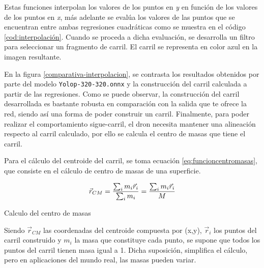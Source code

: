 Estas funciones interpolan los valores de los puntos en \textit{y} en función de los valores de los puntos en \textit{x}, 
más adelante se evalúa los valores de las puntos que se encuentran entre 
ambas regresiones cuadráticas como se muestra en el código \ref{cod:interpolación}. Cuando se proceda a dicha evaluación, se desarrolla un filtro 
para seleccionar un fragmento de carril. El carril se representa en color azul en la imagen resultante.\newline

En la figura \ref{comparativa-interpolacion}, se contrasta los resultados obtenidos por parte del modelo \texttt{Yolop-320-320.onnx} y la construcción del carril calculada a partir de las regresiones. 
Como se puede observar, la construcción del carril desarrollada es bastante robusta en comparación con la salida que te ofrece la red, siendo así una forma de poder construir un 
carril. Finalmente, para poder realizar el comportamiento sigue-carril, el dron necesita mantener una alineación respecto al carril calculado, por ello 
se calcula el centro de masas que tiene el carril. \newline

Para el cálculo del centroide del carril, se toma ecuación \ref{eq:funcioncentromasas}, que consiste en el cálculo de centro de masas de una superficie. \newline
  \begin{myequation}[h]
    \begin{equation} 
      \vec{r}_{CM} = \frac{\sum_{i}m_{i} \vec{r}_{i}}{\sum_{i}m_{i}} = \frac{\sum_{i}m_{i} \vec{r}_{i}}{M} 
      \newline
      \label{eq:funcioncentromasas}
    \end{equation} 
    \caption{Calculo del centro de masas}
  \end{myequation}

  Siendo $\vec{r}_{CM}$ las coordenadas del centroide compuesta por (x,y), $\vec{r}_{i}$ los puntos del carril construido y $m_{i}$ la masa que constituye cada punto, se supone que todos 
  los puntos del carril tienen masa igual a 1. Dicha suposición, simplifica el cálculo, pero en aplicaciones del mundo real, las masas pueden variar. 


